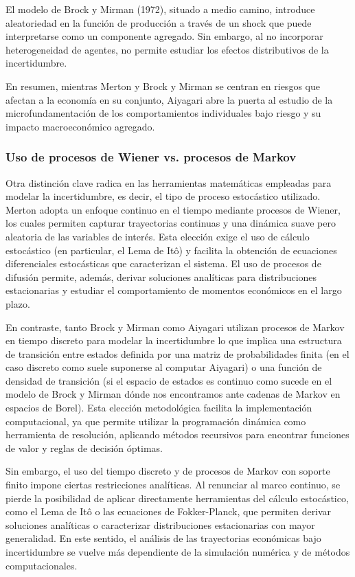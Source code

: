 \documentclass[a4paper,12pt]{article}
\begin{document}
El modelo de Brock y Mirman (1972), situado a medio camino, introduce aleatoriedad en la función de producción a través de un shock que puede interpretarse como un componente agregado. Sin embargo, al no incorporar heterogeneidad de agentes, no permite estudiar los efectos distributivos de la incertidumbre.

En resumen, mientras Merton y Brock y Mirman se centran en riesgos que afectan a la economía en su conjunto, Aiyagari abre la puerta al estudio de la microfundamentación de los comportamientos individuales bajo riesgo y su impacto macroeconómico agregado.

\subsubsection{Uso de procesos de Wiener vs. procesos de Markov}

Otra distinción clave radica en las herramientas matemáticas empleadas para modelar la incertidumbre, es decir, el tipo de proceso estocástico utilizado. Merton adopta un enfoque continuo en el tiempo mediante procesos de Wiener, los cuales permiten capturar trayectorias continuas y una dinámica suave pero aleatoria de las variables de interés. Esta elección exige el uso de cálculo estocástico (en particular, el Lema de Itô) y facilita la obtención de ecuaciones diferenciales estocásticas que caracterizan el sistema. El uso de procesos de difusión permite, además, derivar soluciones analíticas para distribuciones estacionarias y estudiar el comportamiento de momentos económicos en el largo plazo.

En contraste, tanto Brock y Mirman como Aiyagari utilizan procesos de Markov en tiempo discreto para modelar la incertidumbre lo que implica una estructura de transición entre estados definida por una matriz de probabilidades finita (en el caso discreto como suele suponerse al computar Aiyagari) o una función de densidad de transición (si el espacio de estados es continuo como sucede en el modelo de Brock y Mirman dónde nos encontramos ante cadenas de Markov en espacios de Borel). Esta elección metodológica facilita la implementación computacional, ya que permite utilizar la programación dinámica como herramienta de resolución, aplicando métodos recursivos  para encontrar funciones de valor y reglas de decisión óptimas.

Sin embargo, el uso del tiempo discreto y de procesos de Markov con soporte finito impone ciertas restricciones analíticas. Al renunciar al marco continuo, se pierde la posibilidad de aplicar directamente herramientas del cálculo estocástico, como el Lema de Itô o las ecuaciones de Fokker-Planck, que permiten derivar soluciones analíticas o caracterizar distribuciones estacionarias con mayor generalidad. En este sentido, el análisis de las trayectorias económicas bajo incertidumbre se vuelve más dependiente de la simulación numérica y de métodos computacionales.
\end{document}
